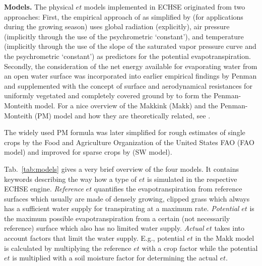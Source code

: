 \documentclass{scrreprt}
\begin{document}
\textbf{Models.}
The physical $et$ models implemented in ECHSE originated from two approaches:
First, the empirical approach of \citet{makkink57} as simplified by \citet{debruin87} (for applications during the growing season) uses global radiation (explicitly), air pressure (implicitly through the use of the psychrometric `constant'), and temperature (implicitly through the use of the slope of the saturated vapor pressure curve and the psychrometric `constant') as predictors for the potential evapotranspiration.
Secondly, the consideration of the net energy available for evaporating water from an open water surface was incorporated into earlier empirical findings by Penman and supplemented with the concept of surface and aerodynamical resistances for uniformly vegetated and completely covered ground by \citet{monteith65} to form the Penman-Monteith model.
For a nice overview of the Makkink (Makk) and the Penman-Monteith (PM) model and how they are theoretically related, see \citet{debruin87}.

The widely used PM formula was later simplified for rough estimates of single crops by the Food and Agriculture Organization of the United States FAO \citep{fao98} (FAO model) and improved for sparse crops by \citet{shuttleworth85} (SW model).

Tab.~\ref{tab:models} gives a very brief overview of the four models.
It contains keywords describing the way how a type of $et$ is simulated in the respective ECHSE engine.
\emph{Reference} $et$ quantifies the evapotranspiration from reference surfaces which usually are made of densely growing, clipped grass which always has a sufficient water supply for transpirating at a maximum rate.
\emph{Potential} $et$ is the maximum possible evapotranspiration from a certain (not necessarily reference) surface which also has no limited water supply.
\emph{Actual} $et$ takes into account factors that limit the water supply.
E.g., potential $et$ in the Makk model is calculated by multiplying the reference $et$ with a crop factor while the potential $et$ is multiplied with a soil moisture factor for determining the actual $et$.
\end{document}
